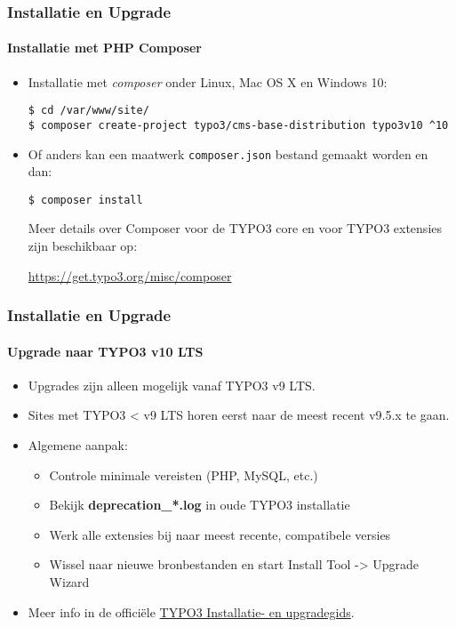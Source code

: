 
\begin{frame}[fragile]
	\frametitle{Installatie en Upgrade}
	\framesubtitle{Installatie met PHP Composer}

	\begin{itemize}
		\item Installatie met \textit{composer} onder Linux, Mac OS X en Windows 10:
\begin{lstlisting}
$ cd /var/www/site/
$ composer create-project typo3/cms-base-distribution typo3v10 ^10
\end{lstlisting}

		\item Of anders kan een maatwerk \texttt{composer.json} bestand gemaakt worden en dan:
\begin{lstlisting}
$ composer install
\end{lstlisting}

		Meer details over Composer voor de TYPO3 core en voor TYPO3 extensies
		zijn beschikbaar op:

		\small
			\href{https://get.typo3.org/misc/composer/}{https://get.typo3.org/misc/composer}
		\normalsize

	\end{itemize}
\end{frame}


\begin{frame}[fragile]
	\frametitle{Installatie en Upgrade}
	\framesubtitle{Upgrade naar TYPO3 v10 LTS}

	\begin{itemize}
		\item Upgrades zijn alleen mogelijk vanaf TYPO3 v9 LTS.
		\item Sites met TYPO3 < v9 LTS horen eerst naar de meest recent v9.5.x te gaan.
	\end{itemize}

	\begin{itemize}
		\item Algemene aanpak:
			\begin{itemize}
				\item Controle minimale vereisten \small(PHP, MySQL, etc.)
				\item Bekijk \textbf{deprecation\_*.log} in oude TYPO3 installatie
				\item Werk alle extensies bij naar meest recente, compatibele versies
				\item Wissel naar nieuwe bronbestanden en start Install Tool -> Upgrade Wizard
			\end{itemize}
		\item Meer info in de offici\"ele
			\href{https://docs.typo3.org/m/typo3/guide-installation/master/en-us/Upgrade/Index.html}{TYPO3 Installatie- en upgradegids}.

	\end{itemize}

\end{frame}

